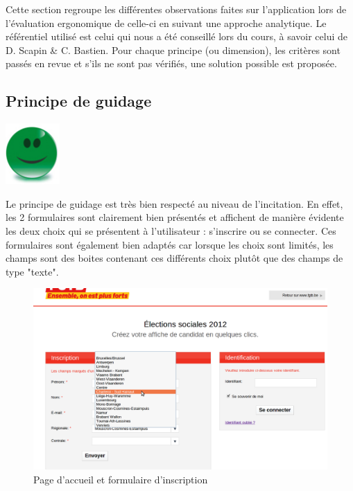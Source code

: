 \documentclass{article}
\begin{document}
\begin{sffamily}
Cette section regroupe les différentes observations faites sur l'application lors de l'évaluation ergonomique de celle-ci en suivant une approche analytique. Le référentiel
utilisé est celui qui nous a été conseillé lors du cours, à savoir celui de D. Scapin \& C. Bastien. Pour chaque principe (ou dimension), les critères sont passés en revue 
et s'ils ne sont pas vérifiés, une solution possible est proposée.

\subsection{Principe de guidage}

\includegraphics[scale=0.27]{good.png}

Le principe de guidage est très bien respecté au niveau de l'incitation. En effet, les 2 formulaires sont clairement bien présentés et affichent de manière évidente les deux 
choix qui se présentent à l'utilisateur : s'inscrire ou se connecter. Ces formulaires sont également bien adaptés car lorsque les choix sont limités, les champs sont des 
boites contenant ces différents choix plutôt que des champs de type "texte".

\begin{figure}[h!]
	\begin{center}
		\includegraphics[scale=0.3]{ergo_001.png} 
		\caption{Page d'accueil et formulaire d'inscription}
	\end{center}
\end{figure}


\end{sffamily}
\end{document}
